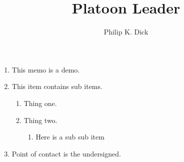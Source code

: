 \documentclass{/app/resources/latex/armymemo-notikz}
\author{Philip K. Dick}\rank{1LT}\branch{EN}
\title{Platoon Leader}
\begin{document}
\begin{enumerate}
\item This memo is a demo.
\item This item contains sub items.
\begin{enumerate}
\item Thing one.
\item Thing two.
\begin{enumerate}
\item Here is a sub sub item
\end{enumerate}
\end{enumerate}
\item Point of contact is the undersigned.
\end{enumerate}
\end{document}
